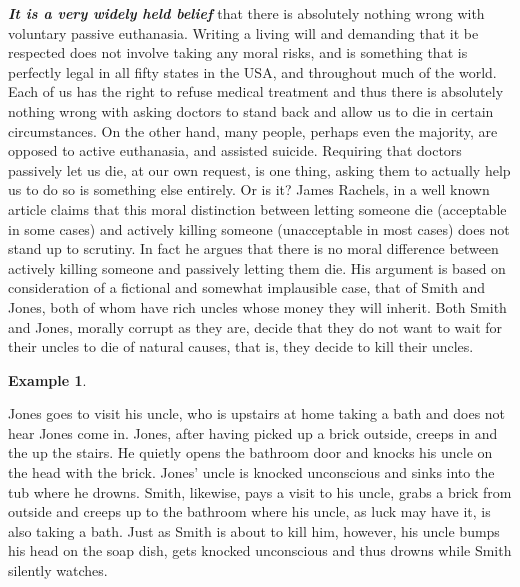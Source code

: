 \documentclass[
  12pt, openany]{book}
\theoremstyle{definition}
\theoremstyle{definition}
\newtheorem{example}{Example}[chapter]
\theoremstyle{definition}
\theoremstyle{remark}
\begin{document}
\textbf{\emph{It is a very widely held belief}} that there is absolutely nothing wrong with voluntary passive euthanasia. Writing a living will and demanding that it be respected does not involve taking any moral risks, and is something that is perfectly legal in all fifty states in the USA, and throughout much of the world. Each of us has the right to refuse medical treatment and thus there is absolutely nothing wrong with asking doctors to stand back and allow us to die in certain circumstances. On the other hand, many people, perhaps even the majority, are opposed to active euthanasia, and assisted suicide. Requiring that doctors passively let us die, at our own request, is one thing, asking them to actually help us to do so is something else entirely. Or is it? James Rachels, in a well known article claims that this moral distinction between letting someone die (acceptable in some cases) and actively killing someone (unacceptable in most cases) does not stand up to scrutiny. In fact he argues that there is no moral difference between actively killing someone and passively letting them die. His argument is based on consideration of a fictional and somewhat implausible case, that of Smith and Jones, both of whom have rich uncles whose money they will inherit. Both Smith and Jones, morally corrupt as they are, decide that they do not want to wait for their uncles to die of natural causes, that is, they decide to kill their uncles.

\begin{center}

\begin{example}
\protect\hypertarget{exm:unlabeled-div-1}{}\label{exm:unlabeled-div-1}

Jones goes to visit his uncle, who is upstairs at home taking a bath and does not hear Jones come in. Jones, after having picked up a brick outside, creeps in and the up the stairs. He quietly opens the bathroom door and knocks his uncle on the head with the brick. Jones' uncle is knocked unconscious and sinks into the tub where he drowns. Smith, likewise, pays a visit to his uncle, grabs a brick from outside and creeps up to the bathroom where his uncle, as luck may have it, is also taking a bath. Just as Smith is about to kill him, however, his uncle bumps his head on the soap dish, gets knocked unconscious and thus drowns while Smith silently watches.

\end{example}

\end{center}
\end{document}
